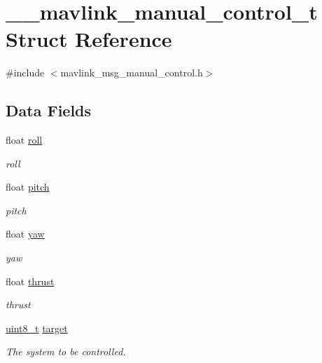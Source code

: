 \hypertarget{struct____mavlink__manual__control__t}{\section{\-\_\-\-\_\-mavlink\-\_\-manual\-\_\-control\-\_\-t Struct Reference}
\label{struct____mavlink__manual__control__t}
}


{\ttfamily \#include $<$mavlink\-\_\-msg\-\_\-manual\-\_\-control.\-h$>$}

\subsection*{Data Fields}
\begin{DoxyCompactItemize}
\item 
float \hyperlink{struct____mavlink__manual__control__t_aaca821a57d718f586cf655f5d1054cbb}{roll}
\begin{DoxyCompactList}\small\item\em roll \end{DoxyCompactList}\item 
float \hyperlink{struct____mavlink__manual__control__t_a12e31b9bd5f10ac7671a42a14dbb732d}{pitch}
\begin{DoxyCompactList}\small\item\em pitch \end{DoxyCompactList}\item 
float \hyperlink{struct____mavlink__manual__control__t_ad96255477bb078c1d23aa4d896d23ec4}{yaw}
\begin{DoxyCompactList}\small\item\em yaw \end{DoxyCompactList}\item 
float \hyperlink{struct____mavlink__manual__control__t_a04cd9731dbcd6359b4f2cc3ae34c410a}{thrust}
\begin{DoxyCompactList}\small\item\em thrust \end{DoxyCompactList}\item 
\hyperlink{stdint_8h_aba7bc1797add20fe3efdf37ced1182c5}{uint8\-\_\-t} \hyperlink{struct____mavlink__manual__control__t_ac69f96effc87ea6377989b2350a2a4eb}{target}
\begin{DoxyCompactList}\small\item\em The system to be controlled. \end{DoxyCompactList}\item 

\end{DoxyCompactItemize}
